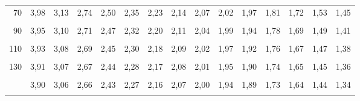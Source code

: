 \documentclass[
  ngerman,
]{article}
\begin{document}
\begin{table}[!h]
{\begin{tabular}{>{}r|rrrrrrrrrrrrrr}
70 & 3,98 & 3,13 & 2,74 & 2,50 & 2,35 & 2,23 & 2,14 & 2,07 & 2,02 & 1,97 & 1,81 & 1,72 & 1,53 & 1,45\\
\cellcolor{gray!6}{80} & \cellcolor{gray!6}{3,96} & \cellcolor{gray!6}{3,11} & \cellcolor{gray!6}{2,72} & \cellcolor{gray!6}{2,49} & \cellcolor{gray!6}{2,33} & \cellcolor{gray!6}{2,21} & \cellcolor{gray!6}{2,13} & \cellcolor{gray!6}{2,06} & \cellcolor{gray!6}{2,00} & \cellcolor{gray!6}{1,95} & \cellcolor{gray!6}{1,79} & \cellcolor{gray!6}{1,70} & \cellcolor{gray!6}{1,51} & \cellcolor{gray!6}{1,43}\\
90 & 3,95 & 3,10 & 2,71 & 2,47 & 2,32 & 2,20 & 2,11 & 2,04 & 1,99 & 1,94 & 1,78 & 1,69 & 1,49 & 1,41\\
\addlinespace
\cellcolor{gray!6}{100} & \cellcolor{gray!6}{3,94} & \cellcolor{gray!6}{3,09} & \cellcolor{gray!6}{2,70} & \cellcolor{gray!6}{2,46} & \cellcolor{gray!6}{2,31} & \cellcolor{gray!6}{2,19} & \cellcolor{gray!6}{2,10} & \cellcolor{gray!6}{2,03} & \cellcolor{gray!6}{1,97} & \cellcolor{gray!6}{1,93} & \cellcolor{gray!6}{1,77} & \cellcolor{gray!6}{1,68} & \cellcolor{gray!6}{1,48} & \cellcolor{gray!6}{1,39}\\
110 & 3,93 & 3,08 & 2,69 & 2,45 & 2,30 & 2,18 & 2,09 & 2,02 & 1,97 & 1,92 & 1,76 & 1,67 & 1,47 & 1,38\\
\cellcolor{gray!6}{120} & \cellcolor{gray!6}{3,92} & \cellcolor{gray!6}{3,07} & \cellcolor{gray!6}{2,68} & \cellcolor{gray!6}{2,45} & \cellcolor{gray!6}{2,29} & \cellcolor{gray!6}{2,18} & \cellcolor{gray!6}{2,09} & \cellcolor{gray!6}{2,02} & \cellcolor{gray!6}{1,96} & \cellcolor{gray!6}{1,91} & \cellcolor{gray!6}{1,75} & \cellcolor{gray!6}{1,66} & \cellcolor{gray!6}{1,46} & \cellcolor{gray!6}{1,37}\\
130 & 3,91 & 3,07 & 2,67 & 2,44 & 2,28 & 2,17 & 2,08 & 2,01 & 1,95 & 1,90 & 1,74 & 1,65 & 1,45 & 1,36\\
\cellcolor{gray!6}{140} & \cellcolor{gray!6}{3,91} & \cellcolor{gray!6}{3,06} & \cellcolor{gray!6}{2,67} & \cellcolor{gray!6}{2,44} & \cellcolor{gray!6}{2,28} & \cellcolor{gray!6}{2,16} & \cellcolor{gray!6}{2,08} & \cellcolor{gray!6}{2,01} & \cellcolor{gray!6}{1,95} & \cellcolor{gray!6}{1,90} & \cellcolor{gray!6}{1,74} & \cellcolor{gray!6}{1,65} & \cellcolor{gray!6}{1,44} & \cellcolor{gray!6}{1,35}\\
\addlinespace
150 & 3,90 & 3,06 & 2,66 & 2,43 & 2,27 & 2,16 & 2,07 & 2,00 & 1,94 & 1,89 & 1,73 & 1,64 & 1,44 & 1,34\\
\cellcolor{gray!6}{200} & \cellcolor{gray!6}{3,89} & \cellcolor{gray!6}{3,04} & \cellcolor{gray!6}{2,65} & \cellcolor{gray!6}{2,42} & \cellcolor{gray!6}{2,26} & \cellcolor{gray!6}{2,14} & \cellcolor{gray!6}{2,06} & \cellcolor{gray!6}{1,98} & \cellcolor{gray!6}{1,93} & \cellcolor{gray!6}{1,88} & \cellcolor{gray!6}{1,72} & \cellcolor{gray!6}{1,62} & \cellcolor{gray!6}{1,41} & \cellcolor{gray!6}{1,32}\\

\end{tabular}}
\end{table}
\end{document}
